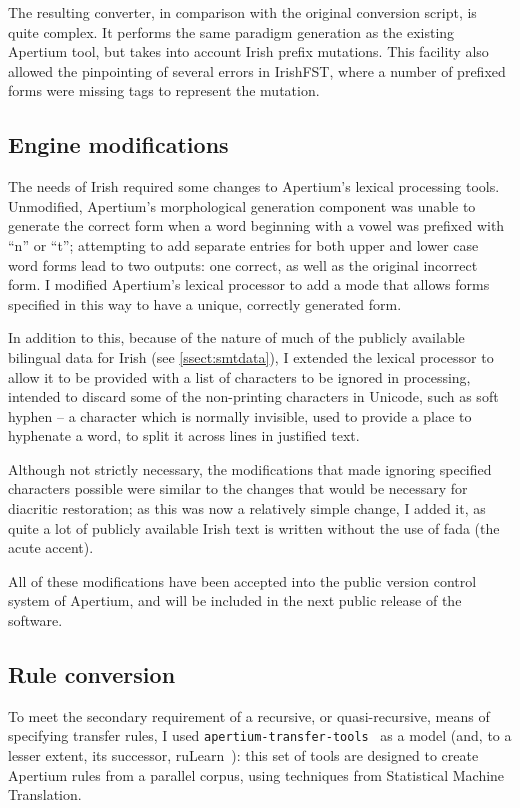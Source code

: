 The resulting converter, in comparison with the original conversion script, is quite complex.
It performs the same paradigm generation as the existing Apertium tool, but takes into
account Irish prefix mutations. This facility also allowed the pinpointing of several errors
in IrishFST, where a number of prefixed forms were missing tags to represent the mutation.

\subsection{Engine modifications}

The needs of Irish required some changes to Apertium's lexical processing tools. Unmodified,
Apertium's morphological generation component was unable to generate the correct form when
a word beginning with a vowel was prefixed with ``n'' or ``t''; attempting to add separate
entries for both upper and lower case word forms lead to two outputs: one correct, as well
as the original incorrect form. I modified Apertium's lexical processor to add a mode that
allows forms specified in this way to have a unique, correctly generated form.

In addition to this, because of the nature of much of the publicly available bilingual data
for Irish (see \ref{ssect:smtdata}), I extended the lexical processor to allow it to be
provided with a list of characters to be ignored in processing, intended to discard some
of the non-printing characters in Unicode, such as soft hyphen -- a character which is
normally invisible, used to provide a place to hyphenate a word, to split it across lines in
justified text.

Although not strictly necessary, the modifications that made ignoring specified characters
possible were similar to the changes that would be necessary for diacritic restoration; as
this was now a relatively simple change, I added it, as quite a lot of publicly available
Irish text is written without the use of fada (the acute accent).

All of these modifications have been accepted into the public version control system of
Apertium, and will be included in the next public release of the software.

\subsection{Rule conversion}

To meet the secondary requirement of a recursive, or quasi-recursive, means of specifying
transfer rules, I used \texttt{apertium-transfer-tools}~\citep{sanchez06a} as a model (and,
to a lesser extent, its successor, ruLearn~\citep{sanchez-cartagena16b}): this set of tools
are designed to create Apertium rules from a parallel corpus, using techniques from Statistical
Machine Translation.


